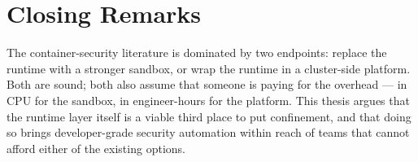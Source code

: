 \section{Closing Remarks}

The container-security literature is dominated by two endpoints: replace the runtime with a stronger sandbox, or wrap the runtime in a cluster-side platform. Both are sound; both also assume that someone is paying for the overhead --- in CPU for the sandbox, in engineer-hours for the platform. This thesis argues that the runtime layer itself is a viable third place to put confinement, and that doing so brings developer-grade security automation within reach of teams that cannot afford either of the existing options.
